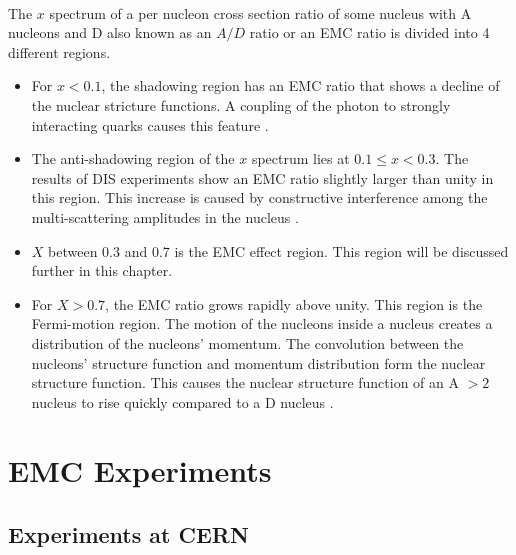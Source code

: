\paragraph{}The $x$ spectrum of a per nucleon cross section ratio of some nucleus with A nucleons and D also known as an $A/D$ ratio or an EMC ratio is divided into 4 different regions. 
\begin{itemize}
	\item For $x < 0.1$, the shadowing region has an EMC ratio that shows a decline of the nuclear stricture functions. A coupling of the photon to strongly interacting quarks causes this feature \cite{PnN}.
	\item The anti-shadowing region of the $x$ spectrum lies at $0.1 \leq x < 0.3 $. The results of DIS experiments show an EMC ratio slightly larger than unity in this region. This increase is caused by constructive interference among the multi-scattering amplitudes in the nucleus \cite{shadowing}.
	\item $X$ between 0.3 and 0.7 is the EMC effect region. This region will be discussed further in this chapter.
	\item For $X > 0.7$, the EMC ratio grows rapidly above unity.  This region is the Fermi-motion region. The  motion of the nucleons inside a nucleus creates a distribution of the nucleons'  momentum. The convolution between the nucleons' structure function and momentum distribution form the nuclear structure function. This causes the nuclear structure function of an A $> 2$ nucleus to rise quickly compared to a D nucleus \cite{Ajth,PnN}. 
\end{itemize}
\section{EMC Experiments}
\subsection{Experiments at CERN}
